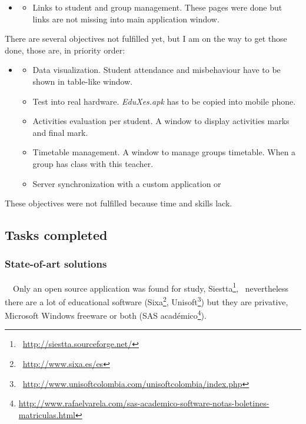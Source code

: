 \documentclass[a4paper]{article}
\begin{document}
\begin{itemize}
\item \begin{itemize}
\item Links to student and group management. These pages were done but
links are not missing into main application window.
\end{itemize}
\end{itemize}
There are several objectives not fulfilled yet, but I am on the way to
get those done, those are, in priority order:

\begin{itemize}
\item \begin{itemize}
\item Data visualization. Student attendance and misbehaviour have to be
shown in table-like window.
\item Test into real hardware. \textit{EduXes.apk} has to be copied into
mobile phone.
\item Activities evaluation per student. A window to display activities
marks and final mark.
\item Timetable management. A window to manage groups timetable. When a
group has class with this teacher.
\item Server synchronization with a custom application or
\end{itemize}
\end{itemize}
These objectives were not fulfilled because time and skills lack.

\clearpage
\bigskip

\subsection[Tasks completed]{Tasks completed}
\hypertarget{RefHeading115501570052158}{}\subsubsection[State{}-of{}-art
solutions]{State-of-art solutions}
\hypertarget{RefHeading146461801272074}{}\ \ Only an open source
application was found for study,
Siestta\footnote{\ \url{http://siestta.sourceforge.net/}},
\ nevertheless there are a lot of educational software
(Sixa\footnote{\ \url{http://www.sixa.es/es}},
Unisoft\footnote{\ \url{http://www.unisoftcolombia.com/unisoftcolombia/index.php}})
but they are privative, Microsoft Windows freeware or both (SAS
académico\footnote{\url{http://www.rafaelvarela.com/sas-academico-software-notas-boletines-matriculas.html}}).
\end{document}
